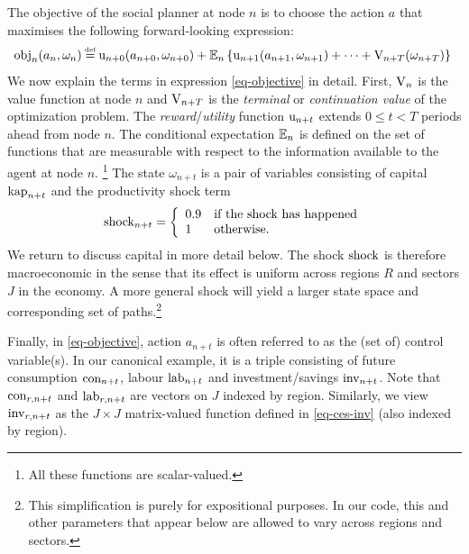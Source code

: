 \documentclass[12pt,a4paper,twoside, draft]{article}
\begin{document}
The objective of the social planner at node $n$ is to choose the action $a$
that maximises the following forward-looking expression:
\begin{align}\label{eq-objective}
\hskip-3pt   \textup{obj}_{n}(a_{n}, \omega_{n}) \defeq
   \textup{u}_{n + 0}(a_{n + 0}, \omega_{n + 0})
    + \mbb{E}_{n}\left\{
      \textup{u}_{n + 1}(a_{n + 1}, \omega_{n + 1}) + \cdots
      + \textup{V}_{n + T}(\omega_{n + T})
    \right\}
\end{align}
We now explain the terms in expression \eqref{eq-objective} in detail.
First, $\textup{V}_{n}$ is the value function at node $n$ and
$\textup{V}_{n + T}$ is the \emph{terminal} or \emph{continuation value} of the
optimization problem.
The \emph{reward}/\emph{utility} function $\textup{u}_{n + t}$ extends
$0 \leq t < T$ periods ahead from node $n$.
The conditional expectation $\mathbb{E}_{n}$ is defined on the set of functions
that are measurable with respect to the information available to the agent at 
node $n$.
\footnote{
   All these functions are scalar-valued.
}
The state $\omega_{n + t} $ is a pair of variables consisting  of capital
$\textup{kap}_{n + t}$ and the productivity shock term
\begin{equation}
   \textup{shock}_{n + t} = \left\{
      \begin{array}{ll}
         0.9 & \textup{if the shock has happened}\\
         1 & \textup{otherwise.}
      \end{array}\right.
\end{equation}
We return to discuss capital in more detail below.
The shock $\textup{shock}$ is therefore macroeconomic in the sense that
its effect is uniform across regions $R$ and sectors $J$ in the economy.
A more general shock will yield a larger state space and corresponding set of
paths.\footnote{
   This simplification is purely for expositional purposes.
   In our code, this and other parameters that appear below are allowed to vary 
   across regions and sectors.
}

Finally, in \eqref{eq-objective}, action $a_{n + t}$ is often referred to as
the (set of) control variable(s).
In our canonical example, it is a triple consisting of future consumption
$\textup{con}_{n + t}$, labour $\textup{lab}_{n + t}$ and investment/savings
$\textup{inv}_{n + t}$.
Note that $\textup{con}_{r, n + t}$ and $\textup{lab}_{r, n + t}$ are vectors
on $J$ indexed by region.
Similarly, we view $\textup{inv}_{r, n + t}$ as the $J\times J$ matrix-valued
function defined in \eqref{eq-ces-inv} (also indexed by region).
\end{document}
